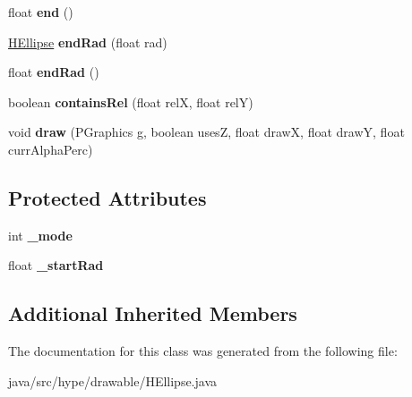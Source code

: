 \begin{DoxyCompactItemize}
\item 
\hypertarget{classhype_1_1drawable_1_1_h_ellipse_a6ff1384aa920dcc6c15690057ae33c24}{float {\bfseries end} ()}\label{classhype_1_1drawable_1_1_h_ellipse_a6ff1384aa920dcc6c15690057ae33c24}

\item 
\hypertarget{classhype_1_1drawable_1_1_h_ellipse_a5b307e00cc0df0f7a9ebe8384a150e8d}{\hyperlink{classhype_1_1drawable_1_1_h_ellipse}{H\-Ellipse} {\bfseries end\-Rad} (float rad)}\label{classhype_1_1drawable_1_1_h_ellipse_a5b307e00cc0df0f7a9ebe8384a150e8d}

\item 
\hypertarget{classhype_1_1drawable_1_1_h_ellipse_a799cccf3358521b4594da6f2371132ee}{float {\bfseries end\-Rad} ()}\label{classhype_1_1drawable_1_1_h_ellipse_a799cccf3358521b4594da6f2371132ee}

\item 
\hypertarget{classhype_1_1drawable_1_1_h_ellipse_ac9695d60c9229944ae52e83e16b19b97}{boolean {\bfseries contains\-Rel} (float rel\-X, float rel\-Y)}\label{classhype_1_1drawable_1_1_h_ellipse_ac9695d60c9229944ae52e83e16b19b97}

\item 
\hypertarget{classhype_1_1drawable_1_1_h_ellipse_a71c00a9c23e26f066688212d47fdd8fc}{void {\bfseries draw} (P\-Graphics g, boolean uses\-Z, float draw\-X, float draw\-Y, float curr\-Alpha\-Perc)}\label{classhype_1_1drawable_1_1_h_ellipse_a71c00a9c23e26f066688212d47fdd8fc}

\end{DoxyCompactItemize}
\subsection*{Protected Attributes}
\begin{DoxyCompactItemize}
\item 
\hypertarget{classhype_1_1drawable_1_1_h_ellipse_aa135a1010364048f6c02b7a01451cc8e}{int {\bfseries \-\_\-mode}}\label{classhype_1_1drawable_1_1_h_ellipse_aa135a1010364048f6c02b7a01451cc8e}

\item 
\hypertarget{classhype_1_1drawable_1_1_h_ellipse_a68c2277274139f7b1866f5b49812457f}{float {\bfseries \-\_\-start\-Rad}}\label{classhype_1_1drawable_1_1_h_ellipse_a68c2277274139f7b1866f5b49812457f}

\end{DoxyCompactItemize}
\subsection*{Additional Inherited Members}


The documentation for this class was generated from the following file\-:\begin{DoxyCompactItemize}
\item 
java/src/hype/drawable/H\-Ellipse.\-java\end{DoxyCompactItemize}
